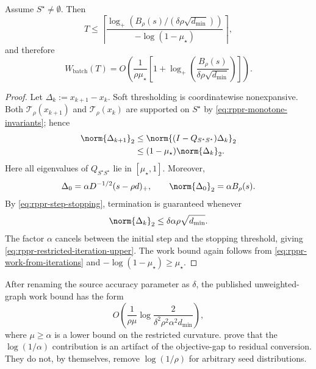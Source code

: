 \begin{proposition}
\label{prop:rppr-restricted-contraction}
Assume \(S^\star\neq\emptyset\).  Then
\begin{equation}
    T
    \leq
    \left\lceil
        \frac{
            \log_+\left(
                B_\rho(s)/(\delta\rho\sqrt{d_{\min}})
            \right)
        }{-\log(1-\mu_\star)}
    \right\rceil,
    \label{eq:rppr-restricted-iteration-upper}
\end{equation}
and therefore
\begin{equation}
    W_{\mathrm{batch}}(T)
    =
    O\left(
        \frac{1}{\rho\mu_\star}
        \left[
            1+
            \log_+\left(
                \frac{B_\rho(s)}
                     {\delta\rho\sqrt{d_{\min}}}
            \right)
        \right]
    \right).
    \label{eq:rppr-restricted-work-upper}
\end{equation}
\end{proposition}

\begin{proof}
Let \(\Delta_k:=x_{k+1}-x_k\).  Soft thresholding is coordinatewise
nonexpansive.  Both \(\mathcal{T}_\rho(x_{k+1})\) and
\(\mathcal{T}_\rho(x_k)\) are supported on \(S^\star\) by
\cref{eq:rppr-monotone-invariants}; hence
\begin{align}
    \norm{\Delta_{k+1}}_2
    &\leq
    \norm{(I-Q_{S^\star S^\star})\Delta_k}_2 \notag\\
    &\leq
    (1-\mu_\star)\norm{\Delta_k}_2.
    \label{eq:rppr-restricted-step-contraction}
\end{align}
Here all eigenvalues of \(Q_{S^\star S^\star}\) lie in
\([\mu_\star,1]\).  Moreover,
\[
    \Delta_0
    =
    \alpha D^{-1/2}(s-\rho d)_+,
    \qquad
    \norm{\Delta_0}_2=\alpha B_\rho(s).
\]
By \cref{eq:rppr-step-stopping}, termination is guaranteed whenever
\[
    \norm{\Delta_k}_2
    \leq\delta\alpha\rho\sqrt{d_{\min}}.
\]
The factor \(\alpha\) cancels between the initial step and the stopping
threshold, giving \cref{eq:rppr-restricted-iteration-upper}.  The work bound
again follows from \cref{eq:rppr-work-from-iterations} and
\(-\log(1-\mu_\star)\geq\mu_\star\).
\end{proof}

\begin{remark}
\label{rem:rppr-published-log-comparison}
After renaming the source accuracy parameter as \(\delta\), the published
unweighted-graph work bound has the form
\begin{equation}
    O\left(
        \frac{1}{\rho\mu}
        \log\frac{2}{\delta^2\rho^2\alpha^2d_{\min}}
    \right),
    \label{eq:rppr-published-work-bound}
\end{equation}
where \(\mu\geq\alpha\) is a lower bound on the restricted curvature.
 prove that
the \(\log(1/\alpha)\) contribution is an artifact of the objective-gap to
residual conversion.  They do not, by themselves, remove
\(\log(1/\rho)\) for arbitrary seed distributions.
\end{remark}

